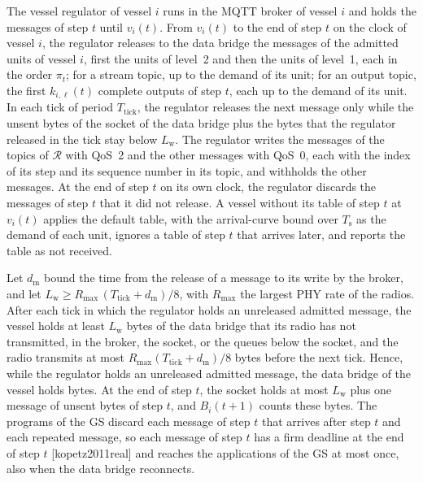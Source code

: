 \begin{definition}\label{def:regulator}
The vessel regulator of vessel $i$ runs in the MQTT broker of vessel $i$ and holds the messages of step $t$ until $v_i(t)$. From $v_i(t)$ to the end of step $t$ on the clock of vessel $i$, the regulator releases to the data bridge the messages of the admitted units of vessel $i$, first the units of level~2 and then the units of level~1, each in the order $\pi_t$; for a stream topic, up to the demand of its unit; for an output topic, the first $k_{i,\ell}(t)$ complete outputs of step $t$, each up to the demand of its unit. In each tick of period $T_{\mathrm{tick}}$, the regulator releases the next message only while the unsent bytes of the socket of the data bridge plus the bytes that the regulator released in the tick stay below $L_{\mathrm{w}}$. The regulator writes the messages of the topics of $\mathcal{R}$ with QoS~2 and the other messages with QoS~0, each with the index of its step and its sequence number in its topic, and withholds the other messages. At the end of step $t$ on its own clock, the regulator discards the messages of step $t$ that it did not release. A vessel without its table of step $t$ at $v_i(t)$ applies the default table, with the arrival-curve bound over $T_{\mathrm{s}}$ as the demand of each unit, ignores a table of step $t$ that arrives later, and reports the table as not received.
\end{definition}

Let $d_{\mathrm{m}}$ bound the time from the release of a message to its write by the broker, and let $L_{\mathrm{w}} \geq R_{\max}\,(T_{\mathrm{tick}} + d_{\mathrm{m}})/8$, with $R_{\max}$ the largest PHY rate of the radios. After each tick in which the regulator holds an unreleased admitted message, the vessel holds at least $L_{\mathrm{w}}$ bytes of the data bridge that its radio has not transmitted, in the broker, the socket, or the queues below the socket, and the radio transmits at most $R_{\max}(T_{\mathrm{tick}} + d_{\mathrm{m}})/8$ bytes before the next tick. Hence, while the regulator holds an unreleased admitted message, the data bridge of the vessel holds bytes. At the end of step $t$, the socket holds at most $L_{\mathrm{w}}$ plus one message of unsent bytes of step $t$, and $B_i(t+1)$ counts these bytes. The programs of the GS discard each message of step $t$ that arrives after step $t$ and each repeated message, so each message of step $t$ has a firm deadline at the end of step $t$ [kopetz2011real] and reaches the applications of the GS at most once, also when the data bridge reconnects.

